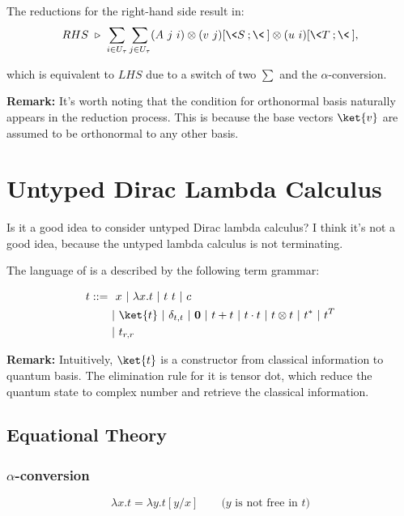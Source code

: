 The reductions for the right-hand side result in:
$$
RHS\ \triangleright\ \sum_{i \in U_\tau} \sum_{j \in U_\tau} (A\ j\ i) \otimes (v\ j)[\<S\>; \<\>] \otimes (u\ i)[\<T\>; \<\>],
$$

which is equivalent to $LHS$ due to a switch of two $\sum$ and the $\alpha$-conversion.

\textbf{Remark: } It's worth noting that the condition for orthonormal basis naturally appears in the reduction process. This is because the base vectors $\ket{v}$ are assumed to be orthonormal to any other basis.




\section{Untyped Dirac Lambda Calculus}
Is it a good idea to consider untyped Dirac lambda calculus? I think it's not a good idea, because the untyped lambda calculus is not terminating.

\begin{definition}

    The language of is a described by the following term grammar:

    \begin{align*}
        t ::=\ & \ x\ |\ \lambda x.t\ |\ t\ t\ |\ c \\
              & |\ \ket{t}\ |\ \delta_{t, t} \ |\ \mathbf{0}\ |\ t + t\ |\ t \cdot t\ |\ t \otimes t\ |\ t^*\ |\ t^T\\
              & |\ t_{r, r}
    \end{align*}

\end{definition}

\textbf{Remark:} Intuitively, $\ket{t}$ is a constructor from classical information to quantum basis. The elimination rule for it is tensor dot, which reduce the quantum state to complex number and retrieve the classical information.


\subsection{Equational Theory}

\subsubsection*{$\alpha$-conversion}
$$
    \lambda x.t = \lambda y.t[y/x]\qquad \text{($y$ is not free in $t$)}
$$

